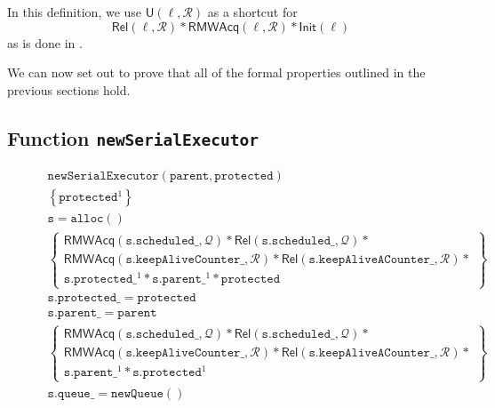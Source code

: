 In this definition, we use $\mathsf{U}(\ell, \mathcal{R})$ as a shortcut for 
$$\mathsf{Rel}(\ell, \mathcal{R}) * \mathsf{RMWAcq}(\ell, \mathcal{R}) * \mathsf{Init}(\ell)$$
as is done in \cite{fsl}.

We can now set out to prove that all of the formal properties outlined in the previous sections hold.

\subsection{Function \texttt{newSerialExecutor}}

\begin{figure}
\begin{equation*}
\begin{array}{l}
	\mathtt{newSerialExecutor(parent, protected)} \\
	
	\left\{\mathtt{protected}^1 \right\}\\

	\mathtt{s = alloc()}\\
			\left\{
			\begin{array}{l}
				\mathsf{RMWAcq}(\mathtt{s.scheduled\_}, \mathcal{Q}) * \mathsf{Rel}(\mathtt{s.scheduled\_}, \mathcal{Q}) * \\ 
					\mathsf{RMWAcq}(\mathtt{s.keepAliveCounter\_}, \mathcal{R}) * \mathsf{Rel}(\mathtt{s.keepAliveACounter\_}, \mathcal{R}) * \\
					\mathtt{s.protected\_}^1 * \mathtt{s.parent\_}^1 * \mathtt{protected}
			\end{array}
		\right\} \\

	\mathtt{s.protected\_ = protected} \\
	\mathtt{s.parent\_ = parent} \\

	\left\{
			\begin{array}{l}
				\mathsf{RMWAcq}(\mathtt{s.scheduled\_}, \mathcal{Q}) * \mathsf{Rel}(\mathtt{s.scheduled\_}, \mathcal{Q}) * \\ 
					\mathsf{RMWAcq}(\mathtt{s.keepAliveCounter\_}, \mathcal{R}) * \mathsf{Rel}(\mathtt{s.keepAliveACounter\_}, \mathcal{R}) * \\
					 \mathtt{s.parent\_}^1 * \mathtt{s.protected}^1
			\end{array} \right\} \\

			\mathtt{s.queue\_ = new Queue()} \\


\end{array}
\end{equation*}
\end{figure}
